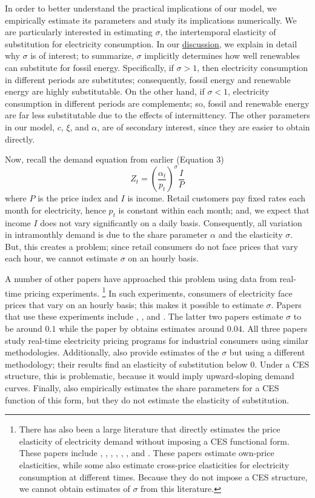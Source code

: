 \documentclass[11pt,a4paper]{extarticle}
\begin{document}
In order to better understand the practical implications of our model, we empirically estimate its parameters and study its implications numerically. We are particularly interested in estimating $\sigma$, the intertemporal elasticity of substitution for electricity consumption. In our  \hyperref[sec:Discussion]{discussion}, we explain in detail why $\sigma$ is of interest; to summarize, $\sigma$ implicitly determines how well renewables can substitute for fossil energy. Specifically, if $\sigma > 1$, then electricity consumption in different periods are substitutes; consequently, fossil energy and renewable energy are highly substitutable. On the other hand, if $\sigma< 1$, electricity consumption in different periods are complements; so, fossil and renewable energy are far less substitutable due to the effects of intermittency. The other parameters in our model, $c$,  $\xi$, and $\alpha$, are of secondary interest, since they are easier to obtain directly. 

Now, recall the demand equation from earlier (Equation 3)
$$Z_t = \left(\frac{\alpha_t}{p_t} \right)^\sigma \frac{I}{P}$$
where $P$ is the price index and $I$ is income. Retail customers pay fixed rates each month for electricity, hence $p_t$ is constant within each month; and, we expect that income $I$ does not vary significantly on a daily basis. Consequently, all variation in intramonthly demand is due to the share parameter $\alpha$ and the elasticity $\sigma$. But, this creates a problem; since retail consumers do not face prices that vary each hour, we cannot estimate  $\sigma$ on an hourly basis. 

A number of other papers have approached this problem using data from real-time pricing experiments.
\footnote{ There has also been a large literature that directly estimates the price elasticity of electricity demand without imposing a CES functional form. These papers include \citet{Wolak}, \citet{Zarnikau}, \citet{Woo}, \citet{Zhou}, \citet{Reiss}, \citet{Fan}, and \citet{Deryugina}. These papers estimate own-price elasticities, while some also estimate cross-price elasticities for electricity consumption at different times. Because they do not impose a CES structure, we cannot obtain estimates of $\sigma$ from this literature. } In such experiments, consumers of electricity face prices that vary on an hourly basis; this makes it possible to estimate $\sigma$. Papers that use these experiments include \citet{Schwarz}, \citet{Herriges}, and \citet{KS1994}.
The latter two papers estimate $\sigma$ to be around $0.1$ while the paper by \citeauthor{Schwarz}  obtains estimates around $0.04$. All three papers study real-time electricity pricing programs for industrial consumers using similar methodologies. Additionally, \citet{Aubin} also provide estimates of the $\sigma$ but using a different methodology; their results find an elasticity of substitution below 0. Under a CES structure, this is problematic, because it would imply upward-sloping demand curves. Finally, \citet{Moha2016} also empirically estimates the share parameters for a CES function of this form, but they do not estimate the elasticity of substitution. 
\end{document}
